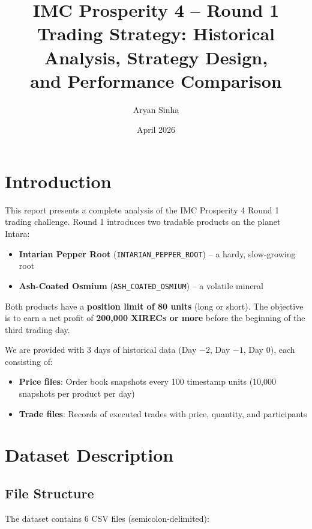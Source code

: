 \documentclass[11pt,a4paper]{article}
\title{\textbf{IMC Prosperity 4 -- Round 1} \\ \Large Trading Strategy: Historical Analysis, Strategy Design, \\ and Performance Comparison}
\author{Aryan Sinha}
\date{April 2026}
\begin{document}
\maketitle
\tableofcontents
\newpage

\section{Introduction}

This report presents a complete analysis of the IMC Prosperity 4 Round 1 trading challenge. Round 1 introduces two tradable products on the planet Intara:

\begin{itemize}
    \item \textbf{Intarian Pepper Root} (\texttt{INTARIAN\_PEPPER\_ROOT}) -- a hardy, slow-growing root
    \item \textbf{Ash-Coated Osmium} (\texttt{ASH\_COATED\_OSMIUM}) -- a volatile mineral
\end{itemize}

Both products have a \textbf{position limit of 80 units} (long or short). The objective is to earn a net profit of \textbf{200,000 XIRECs or more} before the beginning of the third trading day.

We are provided with 3 days of historical data (Day $-2$, Day $-1$, Day $0$), each consisting of:
\begin{itemize}
    \item \textbf{Price files}: Order book snapshots every 100 timestamp units (10,000 snapshots per product per day)
    \item \textbf{Trade files}: Records of executed trades with price, quantity, and participants
\end{itemize}

\section{Dataset Description}

\subsection{File Structure}

The dataset contains 6 CSV files (semicolon-delimited):
\end{document}
